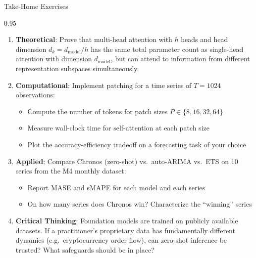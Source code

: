\documentclass[9pt, aspectratio=169, t]{beamer}
\begin{document}
\begin{frame}{Take-Home Exercises}
    \begin{cminipage}{0.95\textwidth}
    {\footnotesize
    \begin{enumerate}\setlength{\itemsep}{2pt}
        \item \textbf{Theoretical}: Prove that multi-head attention with $h$ heads and head dimension $d_k = d_{\text{model}}/h$ has the same total parameter count as single-head attention with dimension $d_{\text{model}}$, but can attend to information from different representation subspaces simultaneously.

        \item \textbf{Computational}: Implement patching for a time series of $T = 1024$ observations:
            \begin{itemize}\setlength{\itemsep}{0pt}
                \item Compute the number of tokens for patch sizes $P \in \{8, 16, 32, 64\}$
                \item Measure wall-clock time for self-attention at each patch size
                \item Plot the accuracy-efficiency tradeoff on a forecasting task of your choice
            \end{itemize}

        \item \textbf{Applied}: Compare Chronos (zero-shot) vs.\ auto-ARIMA vs.\ ETS on 10 series from the M4 monthly dataset:
            \begin{itemize}\setlength{\itemsep}{0pt}
                \item Report MASE and sMAPE for each model and each series
                \item On how many series does Chronos win? Characterize the ``winning'' series
            \end{itemize}

        \item \textbf{Critical Thinking}: Foundation models are trained on publicly available datasets. If a practitioner's proprietary data has fundamentally different dynamics (e.g.\ cryptocurrency order flow), can zero-shot inference be trusted? What safeguards should be in place?
    \end{enumerate}
    }
    \end{cminipage}
\end{frame}
\end{document}

